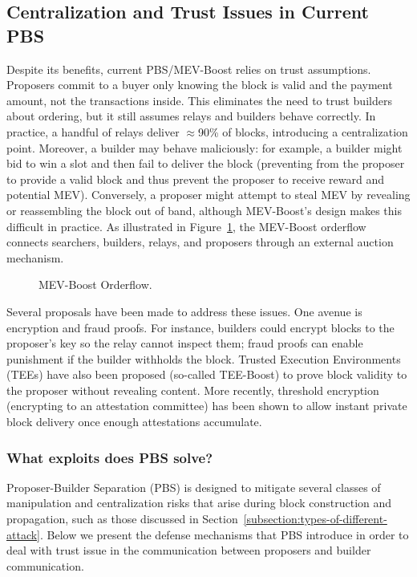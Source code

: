 \documentclass[11pt]{article}
\begin{document}
\subsection{Centralization and Trust Issues in Current PBS}
Despite its benefits, current PBS/MEV-Boost relies on trust assumptions. Proposers commit to a buyer only knowing the block is valid and the payment amount, not the transactions inside. This eliminates the need to trust builders about ordering, but it still assumes relays and builders behave correctly.  In practice, a handful of relays deliver $\approx$90\% of blocks, introducing a centralization point.  Moreover, a builder may behave maliciously: for example, a builder might bid to win a slot and then fail to deliver the block (preventing from the proposer to provide a valid block and thus prevent the proposer to receive reward and potential MEV).  Conversely, a proposer might attempt to steal MEV by revealing or reassembling the block out of band, although MEV-Boost’s design makes this difficult in practice. As illustrated in Figure~\ref{fig:mev-boost-orderflow}, the MEV-Boost orderflow connects searchers, builders, relays, and proposers through an external auction mechanism.

\begin{figure}[h!]
    \makebox[\textwidth][c]{%
    }
    \label{fig:mev-boost-orderflow}
    \caption{MEV-Boost Orderflow.}
\end{figure}


Several proposals have been made to address these issues.  One avenue is encryption and fraud proofs. For instance, builders could encrypt blocks to the proposer’s key so the relay cannot inspect them; fraud proofs can enable punishment if the builder withholds the block. Trusted Execution Environments (TEEs) have also been proposed (so-called TEE-Boost) to prove block validity to the proposer without revealing content. More recently, threshold encryption (encrypting to an attestation committee) has been shown to allow instant private block delivery once enough attestations accumulate. 

\subsubsection{What exploits does PBS solve?}
Proposer-Builder Separation (PBS) is designed to mitigate several classes of manipulation and centralization risks that arise during block construction and propagation, such as those discussed in Section~\ref{subsection:types-of-different-attack}. Below we present the defense mechanisms that PBS introduce in order to deal with trust issue in the communication between proposers and builder communication.
\\[16pt]

\end{document}
